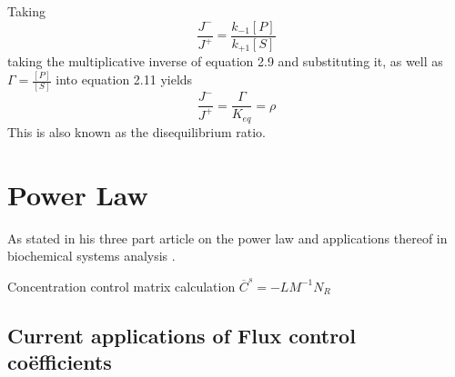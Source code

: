 Taking 
\begin{equation}
\frac{J^-}{J^+} = \frac{k_{-1}[P]}{k_{+1}[S]}
\end{equation}
taking the multiplicative inverse of equation 2.9 and substituting it, as well as $\Gamma = \frac{[P]}{[S]}$ into equation 2.11 yields
\begin{equation}
\frac{J^-}{J^+} = \frac{\Gamma}{K_{eq}} = \rho
\end{equation}
 This is also known as the disequilibrium ratio.

\section{Power Law}
As stated in his three part article on the power law and applications thereof in biochemical systems analysis \cite{Savageau1969a,Savageau1969,Savageau1970}.

Concentration control matrix calculation
$\overline{C}^s=-LM^{-1}N_R$

\subsection{Current applications of Flux control co\"efficients}


